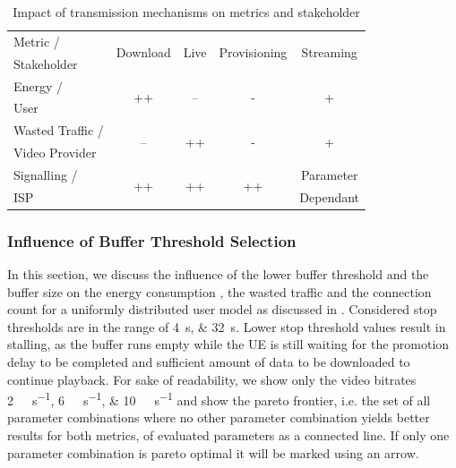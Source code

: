 \begin{table}
  \centering
  \begin{tabular}{lcccc}
    \toprule
    Metric /& \multirow{2}{*}{Download} & \multirow{2}{*}{Live} & \multirow{2}{*}{Provisioning} & \multirow{2}{*}{Streaming}\\
    Stakeholder & & & &\\
    \midrule
    Energy /       & \multirow{2}{*}{++}       & \multirow{2}{*}{--}   & \multirow{2}{*}{-} & \multirow{2}{*}{+}\\
    User & & & &\\
    Wasted Traffic / & \multirow{2}{*}{--} & \multirow{2}{*}{++} & \multirow{2}{*}{-} & \multirow{2}{*}{+} \\
    Video Provider & & & &\\
    Signalling /& \multirow{2}{*}{++} & \multirow{2}{*}{++} & \multirow{2}{*}{++} & Parameter\\
    \gls{ISP} & & & &Dependant\\
    \bottomrule
  \end{tabular}
  \caption{Impact of transmission mechanisms on metrics and stakeholder}
  \label{tab:application:lte_video:trade_offs:mechanism_selection:lessons_learned}
\end{table}

\subsubsection*{Influence of Buffer Threshold Selection}\label{sec:application:lte_video:trade_offs:buffer_threshold_influence}

In this section, we discuss the influence of the lower buffer threshold \bufferlower and the buffer size \buffersize on the energy consumption \power, the wasted traffic \meanwastedtraffic and the connection count \connectioncount for a uniformly distributed user model as discussed in .
Considered stop thresholds are in the range of \SIlist{4;32}{\second}.
Lower stop threshold values result in stalling, as the buffer runs empty while the \gls{UE} is still waiting for the promotion delay to be completed and sufficient amount of data to be downloaded to continue playback.
For sake of readability, we show only the video bitrates \SIlist{2;6;10}{\mega\bit\per\second} and show the pareto frontier, i.e. the set of all parameter combinations where no other parameter combination yields better results for both metrics, of evaluated parameters as a connected line.
If only one parameter combination is pareto optimal it will be marked using an arrow.

